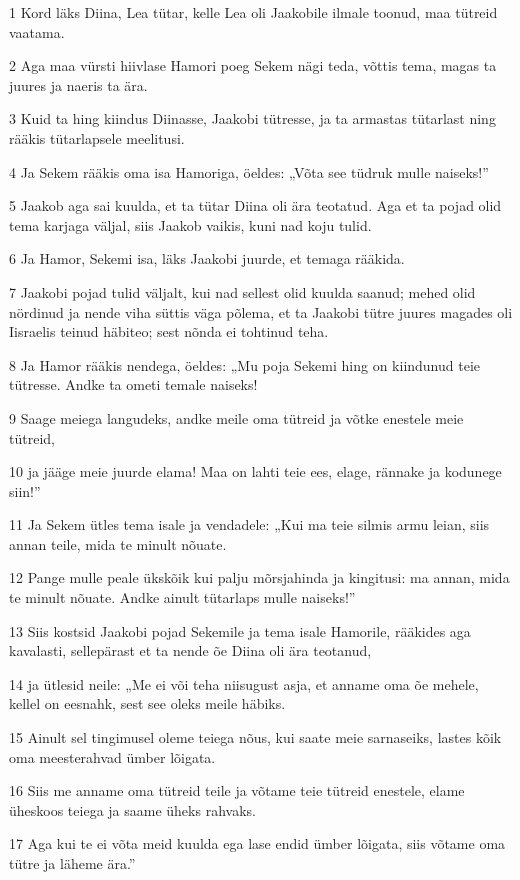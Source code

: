 \par 1 Kord läks Diina, Lea tütar, kelle Lea oli Jaakobile ilmale toonud, maa tütreid vaatama.
\par 2 Aga maa vürsti hiivlase Hamori poeg Sekem nägi teda, võttis tema, magas ta juures ja naeris ta ära.
\par 3 Kuid ta hing kiindus Diinasse, Jaakobi tütresse, ja ta armastas tütarlast ning rääkis tütarlapsele meelitusi.
\par 4 Ja Sekem rääkis oma isa Hamoriga, öeldes: „Võta see tüdruk mulle naiseks!”
\par 5 Jaakob aga sai kuulda, et ta tütar Diina oli ära teotatud. Aga et ta pojad olid tema karjaga väljal, siis Jaakob vaikis, kuni nad koju tulid.
\par 6 Ja Hamor, Sekemi isa, läks Jaakobi juurde, et temaga rääkida.
\par 7 Jaakobi pojad tulid väljalt, kui nad sellest olid kuulda saanud; mehed olid nördinud ja nende viha süttis väga põlema, et ta Jaakobi tütre juures magades oli Iisraelis teinud häbiteo; sest nõnda ei tohtinud teha.
\par 8 Ja Hamor rääkis nendega, öeldes: „Mu poja Sekemi hing on kiindunud teie tütresse. Andke ta ometi temale naiseks!
\par 9 Saage meiega langudeks, andke meile oma tütreid ja võtke enestele meie tütreid,
\par 10 ja jääge meie juurde elama! Maa on lahti teie ees, elage, rännake ja kodunege siin!”
\par 11 Ja Sekem ütles tema isale ja vendadele: „Kui ma teie silmis armu leian, siis annan teile, mida te minult nõuate.
\par 12 Pange mulle peale ükskõik kui palju mõrsjahinda ja kingitusi: ma annan, mida te minult nõuate. Andke ainult tütarlaps mulle naiseks!”
\par 13 Siis kostsid Jaakobi pojad Sekemile ja tema isale Hamorile, rääkides aga kavalasti, sellepärast et ta nende õe Diina oli ära teotanud,
\par 14 ja ütlesid neile: „Me ei või teha niisugust asja, et anname oma õe mehele, kellel on eesnahk, sest see oleks meile häbiks.
\par 15 Ainult sel tingimusel oleme teiega nõus, kui saate meie sarnaseiks, lastes kõik oma meesterahvad ümber lõigata.
\par 16 Siis me anname oma tütreid teile ja võtame teie tütreid enestele, elame üheskoos teiega ja saame üheks rahvaks.
\par 17 Aga kui te ei võta meid kuulda ega lase endid ümber lõigata, siis võtame oma tütre ja läheme ära.”

